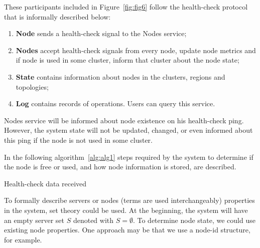\noindent
These participants included in Figure~\ref{fig:fig6} follow the health-check protocol~\label{informal_description_health-check} that is informally described below:

\begin{enumerate}[start=1,label={(\bfseries \arabic*)}]
	\item \textbf{Node} sends a health-check signal to the Nodes service;
	\item \textbf{Nodes} accept health-check signals from every node, update node metrics and if node is used in some cluster, inform that cluster about the node state;
	\item \textbf{State} contains information about nodes in the clusters, regions and topologies;
	\item \textbf{Log} contains records of operations. Users can query this service. 
\end{enumerate}

\noindent
Nodes service will be informed about node existence on his health-check ping. However, the system state will not be updated, changed, or even informed about this ping if the node is not used in some cluster.

In the following algorithm~\ref{alg:alg1} steps required by the system to determine if the node is free or used, and how node information is stored, are described.

\begin{algorithm}[H]
	\SetAlgoLined
	\caption{Health-check data received}
	\label{alg:alg1}
\end{algorithm}

\noindent
To formally describe servers or nodes (terms are used interchangeably) properties in the system, set theory could be used. At the beginning, the system will have an empty server set $S$ denoted with $S=\emptyset$. To determine node state, we could use existing node properties. One approach may be that we use a node-id structure, for example. 

